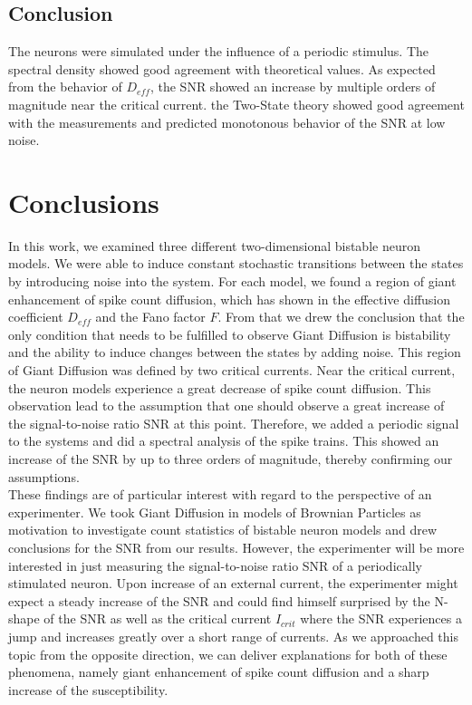 \documentclass[12pt,a4paper]{article}
\begin{document}
\subsection{Conclusion}
The neurons were simulated under the influence of a periodic stimulus. The spectral density showed good agreement with theoretical values. As expected from the behavior of $D_{eff}$, the SNR showed an increase by multiple orders of magnitude near the critical current. the Two-State theory showed good agreement with the measurements and predicted monotonous behavior of the SNR at low noise.
\section{Conclusions}
In this work, we examined three different two-dimensional bistable neuron models. We were able to induce constant stochastic transitions between the states by introducing noise into the system. For each model, we found a region of giant enhancement of spike count diffusion, which has shown in the effective diffusion coefficient $D_{eff}$ and the Fano factor $F$. From that we drew the conclusion that the only condition that needs to be fulfilled to observe Giant Diffusion is bistability and the ability to induce changes between the states by adding noise. This region of Giant Diffusion was defined by two critical currents. Near the critical current, the neuron models experience a great decrease of spike count diffusion. This observation lead to the assumption that one should observe a great increase of the signal-to-noise ratio SNR at this point. Therefore, we added a periodic signal to the systems and did a spectral analysis of the spike trains. This showed an increase of the SNR by up to three orders of magnitude, thereby confirming our assumptions.\\
These findings are of particular interest with regard to the perspective of an experimenter. We took Giant Diffusion in models of Brownian Particles as motivation to investigate count statistics of bistable neuron models and drew conclusions for the SNR from our results. However, the experimenter will be more interested in just measuring the signal-to-noise ratio SNR of a periodically stimulated neuron. Upon increase of an external current, the experimenter might expect a steady increase of the SNR and could find himself surprised by the N-shape of the SNR as well as the critical current $I_{crit}$ where the SNR experiences a jump and increases greatly over a short range of currents. As we approached this topic from the opposite direction, we can deliver explanations for both of these phenomena, namely giant enhancement of spike count diffusion and a sharp increase of the susceptibility.
\end{document}
